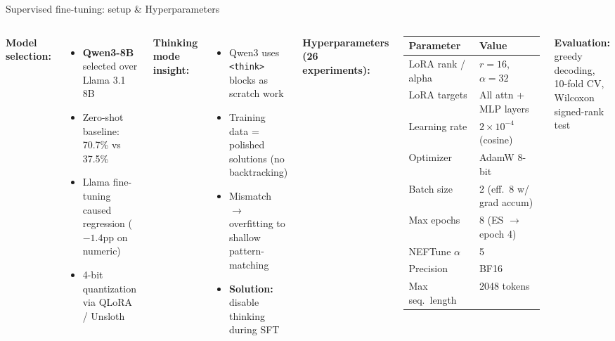 \documentclass[aspectratio=169,10pt]{beamer}
\begin{document}
\begin{frame}{Supervised fine-tuning: setup \& Hyperparameters}
\begin{columns}[T]
\textbf{Model selection:}
\begin{itemize}\small
  \item \textbf{Qwen3-8B} selected over Llama 3.1 8B
  \item Zero-shot baseline: 70.7\% vs 37.5\%
  \item Llama fine-tuning caused regression ($-1.4$pp on numeric)
  \item 4-bit quantization via QLoRA / Unsloth
\end{itemize}

\vspace{0.3em}
\textbf{Thinking mode insight:}
\begin{itemize}\small
  \item Qwen3 uses \texttt{<think>} blocks as scratch work
  \item Training data = polished solutions (no backtracking)
  \item Mismatch $\to$ overfitting to shallow pattern-matching
  \item \textbf{Solution:} disable thinking during SFT
\end{itemize}

\textbf{Hyperparameters (26 experiments):}
\vspace{0.3em}

\centering
\begin{tabular}{@{}ll@{}}
  \toprule
  \textbf{Parameter} & \textbf{Value} \\
  \midrule
  LoRA rank / alpha & $r\!=\!16$, $\alpha\!=\!32$ \\
  LoRA targets & All attn + MLP layers \\
  Learning rate & $2\!\times\!10^{-4}$ (cosine) \\
  Optimizer & AdamW 8-bit \\
  Batch size & 2 (eff.\ 8 w/ grad accum) \\
  Max epochs & 8 (ES $\to$ epoch 4) \\
  NEFTune $\alpha$ & 5 \\
  Precision & BF16 \\
  Max seq.\ length & 2048 tokens \\
  \bottomrule
\end{tabular}

\vspace{0.4em}
\small\textbf{Evaluation:} greedy decoding, 10-fold CV,\\Wilcoxon signed-rank test
\end{columns}
\end{frame}
\end{document}
